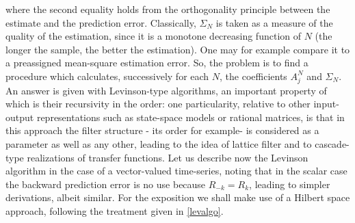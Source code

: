 where the second equality holds from the orthogonality principle
between the estimate and the prediction error.
Classically, $\Sigma_N$ is taken as a measure of the quality of the 
estimation, since it is a monotone decreasing function of $N$ 
(the longer the sample, the better the estimation). One may for example
compare it to a preassigned mean-square estimation error. So, the 
problem is to find a procedure which calculates, successively for each $N$, 
the coefficients $A^N_j$ and $\Sigma_N$. An answer is given with
Levinson-type algorithms, an important property of which is 
their recursivity in the order: one  particularity, relative to
other input-output representations such as state-space models
or rational matrices, is that in this approach the filter
structure - its order for example- is considered as a parameter
as well as any other, leading to the idea of lattice filter and
to cascade-type realizations of transfer functions.
Let us describe now the Levinson algorithm in the case of a vector-valued
time-series, noting that in the scalar case the backward prediction
error is no use because $R_{-k}=R_k$, leading to simpler derivations, 
albeit similar. For the exposition we shall make use of a Hilbert space
approach, following the treatment given in \ref{levalgo}.
